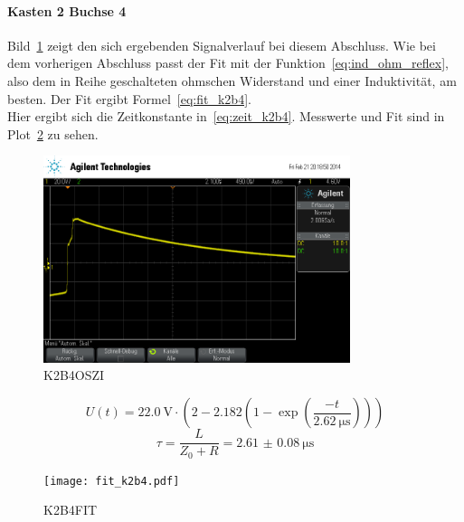 \paragraph{Kasten 2 Buchse 4}
Bild~\ref{fig:k2b4} zeigt den sich ergebenden Signalverlauf 
bei diesem Abschluss. 
Wie bei dem vorherigen Abschluss passt der Fit mit der 
Funktion~\eqref{eq:ind_ohm_reflex}, also dem in Reihe geschalteten 
ohmschen Widerstand und einer Induktivität, am besten. 
Der Fit ergibt Formel~\eqref{eq:fit_k2b4}.\\
Hier ergibt sich die Zeitkonstante in~\eqref{eq:zeit_k2b4}. 
Messwerte und Fit sind in Plot~\ref{fig:fit_k2b4} zu sehen.\\
%
\begin{figure}[]
\centering
\includegraphics[width=0.8\textwidth]{k2b4.png}
\caption{K2B4OSZI}
\label{fig:k2b4}
\end{figure}
%
\begin{equation}
U(t) = \SI{22.0}{\volt}\cdot\left(2 - 
2.182\left(1-\exp{\left(\frac{-t}{\SI{2.62}{\micro\second}}\right)}
\right)\right)
\label{eq:fit_k2b4}
\end{equation}
%
\begin{equation}
\tau = \frac{L}{Z_0 + R} = \SI{2.61(8)}{\micro\second}
\label{eq:zeit_k2b4}
\end{equation}
%
\begin{figure}[]
\centering
\texttt{[image: fit\_k2b4.pdf]}
\caption{K2B4FIT}
\label{fig:fit_k2b4}
\end{figure}
%
\FloatBarrier
%
